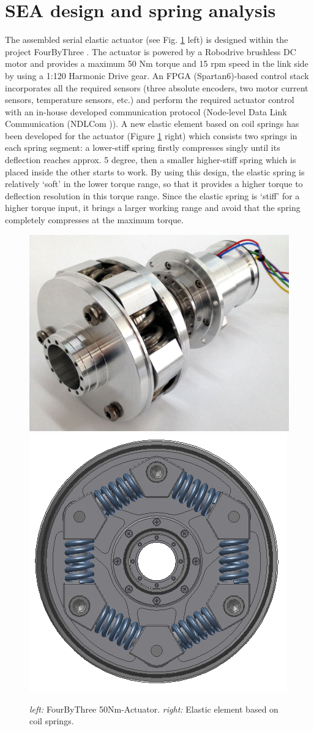\section{SEA design and spring analysis}
\label{sec:SEAdesign}
The assembled serial elastic actuator (see Fig. \ref{fig:4by3_50Nm_actuator} left) is designed within the project FourByThree \cite{Jose2016}. The actuator is powered by a Robodrive brushless DC motor and provides a maximum 50 Nm torque and 15 rpm speed in the link side by using a 1:120 Harmonic Drive gear. An FPGA (Spartan6)-based control stack  incorporates all the required sensors (three absolute encoders, two motor current sensors, temperature sensors, etc.) and perform the required actuator control with an in-house developed communication protocol (Node-level Data Link Communication (NDLCom \cite{Zenzes2016})). A new elastic element based on coil springs has been developed for the actuator (Figure \ref{fig:4by3_50Nm_actuator} right) which consists two springs in each spring segment: a lower-stiff spring firstly compresses singly until its deflection reaches approx. 5 degree, then a smaller higher-stiff spring which is placed inside the other starts to work. By using this design, the elastic spring is relatively `soft' in the lower torque range, so that it provides a higher torque to deflection resolution in this torque range. Since the elastic spring is `stiff' for a higher torque input, it brings a larger working range and avoid that the spring completely compresses at the maximum torque. 

\begin{figure}[htb]
\centering
\includegraphics[width=0.4\columnwidth]{./images/50NmJoint_WithoutHousing_07.jpg}
\includegraphics[width=0.3\columnwidth]{./images/Spring_Coupling_03.jpg}
 \caption{\textit{left:} FourByThree 50Nm-Actuator. \textit{right:} Elastic element based on coil springs.}
 \label{fig:4by3_50Nm_actuator}
\end{figure}

